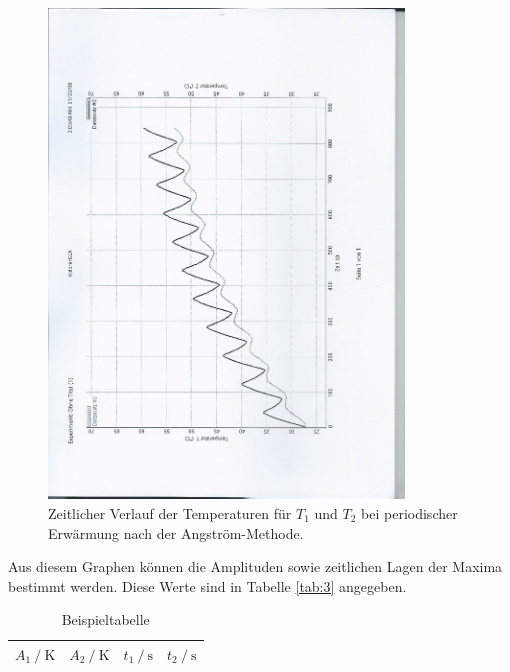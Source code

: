 \begin{figure}
  \centering
  \includegraphics[height=13cm, angle=270]{scan-3.jpg}
  \caption{Zeitlicher Verlauf der Temperaturen für $T_1$ und $T_2$ bei periodischer Erwärmung nach der Angström-Methode.}
  \label{fig:5}
\end{figure}

Aus diesem Graphen können die Amplituden sowie zeitlichen Lagen der Maxima bestimmt werden.
Diese Werte sind in Tabelle \ref{tab:3} angegeben.

\begin{table}
  \centering
  \caption{Beispieltabelle}
  \label{tab:tabelle_beispiel}
  \begin{tabular}{c c c c}
    \toprule
    {$A_1 \:/\: \si{\kelvin}$} & {$A_2 \:/\: \si{\kelvin}$}  & {$t_1 \:/\: \si{\second}$}  & {$t_2 \:/\: \si{\second}$}\\
    \midrule
    
    \bottomrule
  \end{tabular}
\end{table}


%    
%

